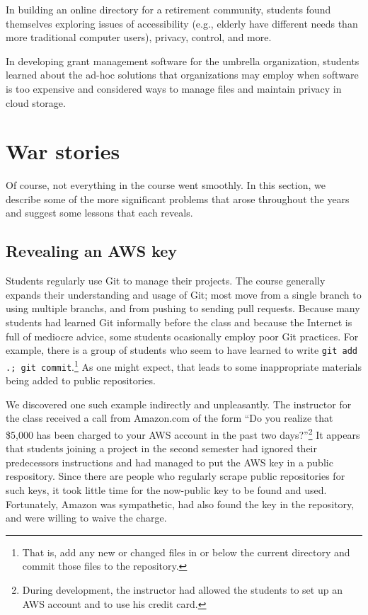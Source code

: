 In building an online directory for a retirement community, students
found themselves exploring issues of accessibility (e.g., elderly
have different needs than more traditional computer users), privacy,
control, and more.

In developing grant management software for the umbrella organization,
students learned about the ad-hoc solutions that organizations may employ
when software is too expensive and considered ways to manage files and
maintain privacy in cloud storage.


\section{War stories}

Of course, not everything in the course went smoothly.  In this section,
we describe some of the more significant problems that arose throughout
the years and suggest some lessons that each reveals.

\subsection{Revealing an AWS key}

Students regularly use Git to manage their projects.  The course
generally expands their understanding and usage of Git; most move
from a single branch to using multiple branchs, and from pushing
to sending pull requests.  Because many students had learned Git
informally before the class and because the Internet is full of
mediocre advice, some students ocasionally employ poor Git practices.
For example, there is a group of students who seem to have learned
to write \texttt{git add .; git commit}.\footnote{That is, add any
new or changed files in or below the current directory and commit
those files to the repository.}  As one might expect, that leads
to some inappropriate materials being added to public repositories.

We discovered one such example indirectly and unpleasantly.  The
instructor for the class received a call from Amazon.com of the
form ``Do you realize that \$5,000 has been charged to your AWS
account in the past two days?''\footnote{During development, the
instructor had allowed the students to set up an AWS account and
to use his credit card.}  It appears that students joining a project
in the second semester had ignored their predecessors instructions
and had managed to put the AWS key in a public respository.  Since
there are people who regularly scrape public repositories for such
keys, it took little time for the now-public key to be found and
used.  Fortunately, Amazon was sympathetic, had also found the
key in the repository, and were willing to waive the charge.

